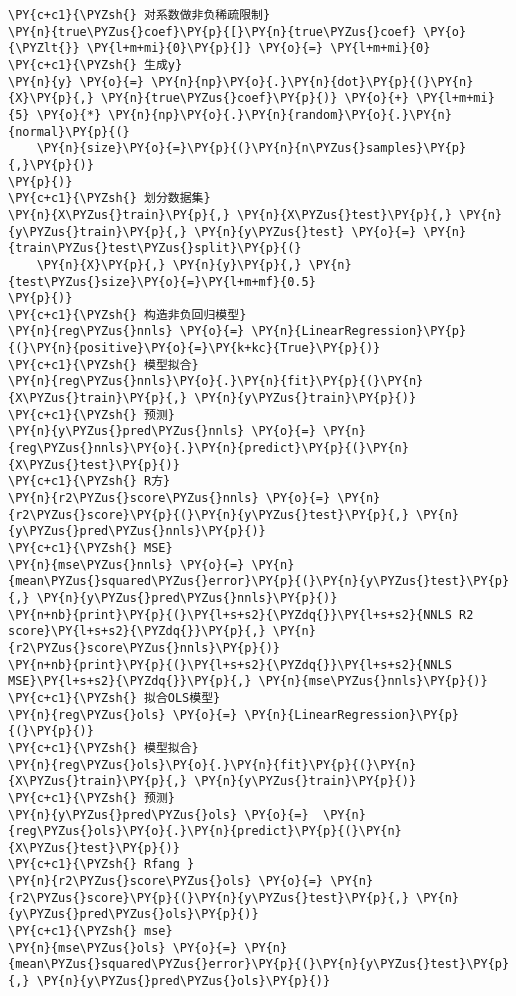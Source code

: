 \begin{Verbatim}[commandchars=\\\{\}]
\PY{c+c1}{\PYZsh{} 对系数做非负稀疏限制}
\PY{n}{true\PYZus{}coef}\PY{p}{[}\PY{n}{true\PYZus{}coef} \PY{o}{\PYZlt{}} \PY{l+m+mi}{0}\PY{p}{]} \PY{o}{=} \PY{l+m+mi}{0}
\PY{c+c1}{\PYZsh{} 生成y}
\PY{n}{y} \PY{o}{=} \PY{n}{np}\PY{o}{.}\PY{n}{dot}\PY{p}{(}\PY{n}{X}\PY{p}{,} \PY{n}{true\PYZus{}coef}\PY{p}{)} \PY{o}{+} \PY{l+m+mi}{5} \PY{o}{*} \PY{n}{np}\PY{o}{.}\PY{n}{random}\PY{o}{.}\PY{n}{normal}\PY{p}{(}
    \PY{n}{size}\PY{o}{=}\PY{p}{(}\PY{n}{n\PYZus{}samples}\PY{p}{,}\PY{p}{)}
\PY{p}{)}
\PY{c+c1}{\PYZsh{} 划分数据集}
\PY{n}{X\PYZus{}train}\PY{p}{,} \PY{n}{X\PYZus{}test}\PY{p}{,} \PY{n}{y\PYZus{}train}\PY{p}{,} \PY{n}{y\PYZus{}test} \PY{o}{=} \PY{n}{train\PYZus{}test\PYZus{}split}\PY{p}{(}
    \PY{n}{X}\PY{p}{,} \PY{n}{y}\PY{p}{,} \PY{n}{test\PYZus{}size}\PY{o}{=}\PY{l+m+mf}{0.5}
\PY{p}{)}
\PY{c+c1}{\PYZsh{} 构造非负回归模型}
\PY{n}{reg\PYZus{}nnls} \PY{o}{=} \PY{n}{LinearRegression}\PY{p}{(}\PY{n}{positive}\PY{o}{=}\PY{k+kc}{True}\PY{p}{)}
\PY{c+c1}{\PYZsh{} 模型拟合}
\PY{n}{reg\PYZus{}nnls}\PY{o}{.}\PY{n}{fit}\PY{p}{(}\PY{n}{X\PYZus{}train}\PY{p}{,} \PY{n}{y\PYZus{}train}\PY{p}{)}
\PY{c+c1}{\PYZsh{} 预测}
\PY{n}{y\PYZus{}pred\PYZus{}nnls} \PY{o}{=} \PY{n}{reg\PYZus{}nnls}\PY{o}{.}\PY{n}{predict}\PY{p}{(}\PY{n}{X\PYZus{}test}\PY{p}{)}
\PY{c+c1}{\PYZsh{} R方}
\PY{n}{r2\PYZus{}score\PYZus{}nnls} \PY{o}{=} \PY{n}{r2\PYZus{}score}\PY{p}{(}\PY{n}{y\PYZus{}test}\PY{p}{,} \PY{n}{y\PYZus{}pred\PYZus{}nnls}\PY{p}{)}
\PY{c+c1}{\PYZsh{} MSE}
\PY{n}{mse\PYZus{}nnls} \PY{o}{=} \PY{n}{mean\PYZus{}squared\PYZus{}error}\PY{p}{(}\PY{n}{y\PYZus{}test}\PY{p}{,} \PY{n}{y\PYZus{}pred\PYZus{}nnls}\PY{p}{)}
\PY{n+nb}{print}\PY{p}{(}\PY{l+s+s2}{\PYZdq{}}\PY{l+s+s2}{NNLS R2 score}\PY{l+s+s2}{\PYZdq{}}\PY{p}{,} \PY{n}{r2\PYZus{}score\PYZus{}nnls}\PY{p}{)}
\PY{n+nb}{print}\PY{p}{(}\PY{l+s+s2}{\PYZdq{}}\PY{l+s+s2}{NNLS MSE}\PY{l+s+s2}{\PYZdq{}}\PY{p}{,} \PY{n}{mse\PYZus{}nnls}\PY{p}{)}
\PY{c+c1}{\PYZsh{} 拟合OLS模型}
\PY{n}{reg\PYZus{}ols} \PY{o}{=} \PY{n}{LinearRegression}\PY{p}{(}\PY{p}{)}
\PY{c+c1}{\PYZsh{} 模型拟合}
\PY{n}{reg\PYZus{}ols}\PY{o}{.}\PY{n}{fit}\PY{p}{(}\PY{n}{X\PYZus{}train}\PY{p}{,} \PY{n}{y\PYZus{}train}\PY{p}{)}
\PY{c+c1}{\PYZsh{} 预测}
\PY{n}{y\PYZus{}pred\PYZus{}ols} \PY{o}{=}  \PY{n}{reg\PYZus{}ols}\PY{o}{.}\PY{n}{predict}\PY{p}{(}\PY{n}{X\PYZus{}test}\PY{p}{)}
\PY{c+c1}{\PYZsh{} Rfang }
\PY{n}{r2\PYZus{}score\PYZus{}ols} \PY{o}{=} \PY{n}{r2\PYZus{}score}\PY{p}{(}\PY{n}{y\PYZus{}test}\PY{p}{,} \PY{n}{y\PYZus{}pred\PYZus{}ols}\PY{p}{)}
\PY{c+c1}{\PYZsh{} mse}
\PY{n}{mse\PYZus{}ols} \PY{o}{=} \PY{n}{mean\PYZus{}squared\PYZus{}error}\PY{p}{(}\PY{n}{y\PYZus{}test}\PY{p}{,} \PY{n}{y\PYZus{}pred\PYZus{}ols}\PY{p}{)}

\end{Verbatim}
